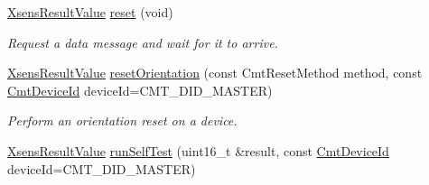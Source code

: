 \begin{DoxyCompactItemize}
\item 
\hyperlink{group__enums_ga822a2260a20af524029eef9e9a51ff6f}{\-Xsens\-Result\-Value} \hyperlink{classxsens_1_1Cmt3_ad28f4deba9ae0458df2d62d6681bd79e}{reset} (void)
\begin{DoxyCompactList}\small\item\em \-Request a data message and wait for it to arrive. \end{DoxyCompactList}\item 
\hyperlink{group__enums_ga822a2260a20af524029eef9e9a51ff6f}{\-Xsens\-Result\-Value} \hyperlink{classxsens_1_1Cmt3_ae783cb282cf31321ef71f6f2058fd3e9}{reset\-Orientation} (const \-Cmt\-Reset\-Method method, const \hyperlink{cmtdef_8h_a2e3b6a17360828d440ee848959918af2}{\-Cmt\-Device\-Id} device\-Id=\-C\-M\-T\-\_\-\-D\-I\-D\-\_\-\-M\-A\-S\-T\-E\-R)
\begin{DoxyCompactList}\small\item\em \-Perform an orientation reset on a device. \end{DoxyCompactList}\item 
\hypertarget{classxsens_1_1Cmt3_a7affeb7f9aec046dda6839bc61e0ccf0}{\hyperlink{group__enums_ga822a2260a20af524029eef9e9a51ff6f}{\-Xsens\-Result\-Value} \hyperlink{classxsens_1_1Cmt3_a7affeb7f9aec046dda6839bc61e0ccf0}{run\-Self\-Test} (uint16\-\_\-t \&result, const \hyperlink{cmtdef_8h_a2e3b6a17360828d440ee848959918af2}{\-Cmt\-Device\-Id} device\-Id=\-C\-M\-T\-\_\-\-D\-I\-D\-\_\-\-M\-A\-S\-T\-E\-R)}\label{classxsens_1_1Cmt3_a7affeb7f9aec046dda6839bc61e0ccf0}


\end{DoxyCompactItemize}
